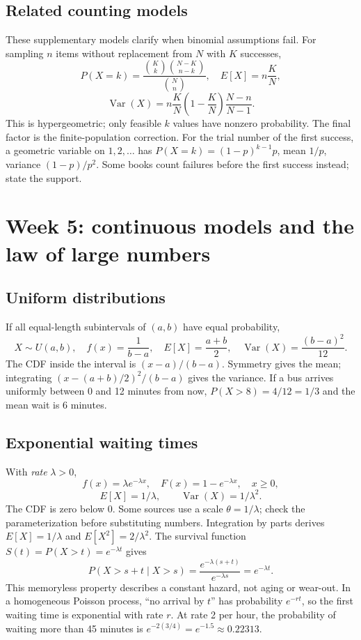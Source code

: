 \subsection{Related counting models}
These supplementary models clarify when binomial assumptions fail.
For sampling $n$ items without replacement from $N$ with $K$ successes,
\[
P(X=k)=\frac{\binom Kk\binom{N-K}{n-k}}{\binom Nn},\quad
E[X]=n\frac KN,
\]
\[
\operatorname{Var}(X)=n\frac KN\left(1-\frac KN\right)\frac{N-n}{N-1}.
\]
This is hypergeometric; only feasible $k$ values have nonzero probability.
The final factor is the finite-population correction. For the trial number
of the first success, a geometric variable on $1,2,\ldots$ has
$P(X=k)=(1-p)^{k-1}p$, mean $1/p$, variance $(1-p)/p^2$.
Some books count failures before the first success instead; state the support.

\clearpage
\section{Week 5: continuous models and the law of large numbers}
\subsection{Uniform distributions}
If all equal-length subintervals of $(a,b)$ have equal probability,
\[
X\sim U(a,b),\quad f(x)=\frac1{b-a},\quad
E[X]=\frac{a+b}2,\quad \operatorname{Var}(X)=\frac{(b-a)^2}{12}.
\]
The CDF inside the interval is $(x-a)/(b-a)$. Symmetry gives the mean;
integrating $(x-(a+b)/2)^2/(b-a)$ gives the variance.
If a bus arrives uniformly between 0 and 12 minutes from now,
$P(X>8)=4/12=1/3$ and the mean wait is 6 minutes.

\subsection{Exponential waiting times}
With \emph{rate} $\lambda>0$,
\[
f(x)=\lambda e^{-\lambda x},\quad F(x)=1-e^{-\lambda x},\quad x\geq0,
\]
\[
E[X]=1/\lambda,\qquad \operatorname{Var}(X)=1/\lambda^2.
\]
The CDF is zero below 0. Some sources use a scale $\theta=1/\lambda$;
check the parameterization before substituting numbers.
Integration by parts derives $E[X]=1/\lambda$ and $E[X^2]=2/\lambda^2$.
The survival function $S(t)=P(X>t)=e^{-\lambda t}$ gives
\[
P(X>s+t\mid X>s)=\frac{e^{-\lambda(s+t)}}{e^{-\lambda s}}
=e^{-\lambda t}.
\]
This memoryless property describes a constant hazard, not aging or wear-out.
In a homogeneous Poisson process, ``no arrival by $t$'' has probability
$e^{-rt}$, so the first waiting time is exponential with rate $r$.
At rate 2 per hour, the probability of waiting more than 45 minutes is
$e^{-2(3/4)}=e^{-1.5}\approx0.22313$.


